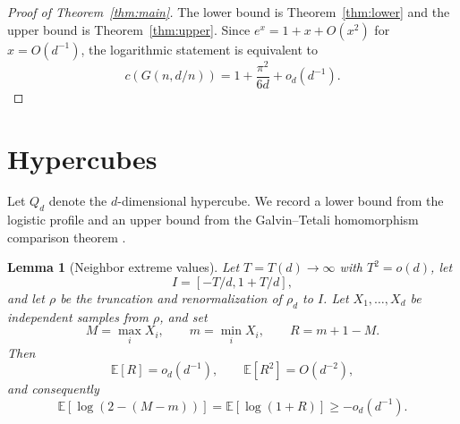 \documentclass[11pt]{article}
\newtheorem{lemma}[theorem]{Lemma}
\theoremstyle{definition}
\newcommand{\EE}{\mathbb{E}}
\begin{document}
\begin{proof}[Proof of Theorem~\ref{thm:main}]
The lower bound is Theorem~\ref{thm:lower} and the upper bound is Theorem~\ref{thm:upper}.  Since $e^x=1+x+O(x^2)$ for $x=O(d^{-1})$, the logarithmic statement is equivalent to
\[
  c(G(n,d/n))=1+\frac{\pi^2}{6d}+o_d(d^{-1}).
\]
\end{proof}

\section{Hypercubes}\label{sec:hypercube}

Let $Q_d$ denote the $d$-dimensional hypercube.  We record a lower bound from the logistic profile and an upper bound from the Galvin--Tetali homomorphism comparison theorem \cite{GalvinTetali}.

\begin{lemma}[Neighbor extreme values]\label{lem:neighbor-extremes}
Let $T=T(d)\to\infty$ with $T^2=o(d)$, let
\[
  I=[-T/d,1+T/d],
\]
and let $\rho$ be the truncation and renormalization of $\rho_d$ to $I$.  Let $X_1,\ldots,X_d$ be independent samples from $\rho$, and set
\[
  M=\max_i X_i,
  \qquad
  m=\min_i X_i,
  \qquad
  R=m+1-M.
\]
Then
\[
  \EE \left[R\right]=o_d(d^{-1}),
  \qquad
  \EE \left[R^2\right]=O(d^{-2}),
\]
and consequently
\[
  \EE\left[\log(2-(M-m))\right]=\EE\left[\log(1+R)\right]\ge -o_d(d^{-1}).
\]
\end{lemma}
\end{document}
